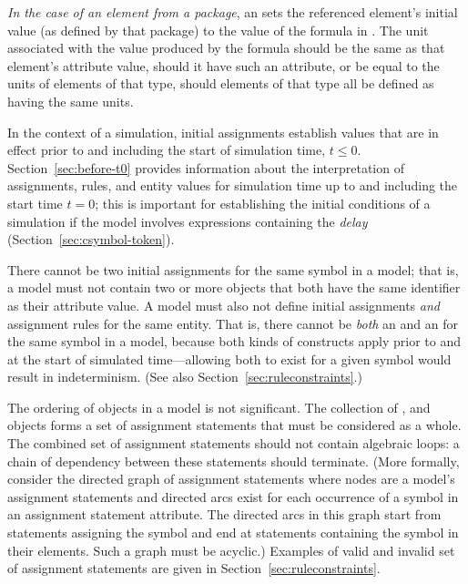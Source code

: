 \begin{itemize}
\begin{blockChanged}
\item \emph{In the case of an element from a package}, an \InitialAssignment sets
  the referenced element's initial value (as defined by that package) to the value of the formula in
  .  The unit associated with the value produced by
  the formula should be the same as that element's 
  attribute value, should it have such an attribute, or be equal to
  the units of elements of that type, should elements of that type
  all be defined as having the same units.

\end{blockChanged}

\end{itemize}

In the context of a simulation, initial assignments establish
values that are in effect prior to and including the start of
simulation time, \ie $t \leq 0$.  Section~\ref{sec:before-t0}
provides information about the interpretation of assignments,
rules, and entity values for simulation time up to and including
the start time $t = 0$; this is important for establishing the
initial conditions of a simulation if the model involves
expressions containing the \emph{delay} 
(Section~\ref{sec:csymbol-token}).

There cannot be two initial assignments for the same symbol in a
model; that is, a model must not contain two or more
\InitialAssignment objects that both have the same identifier as
their  attribute value.  A model must also not define
initial assignments \emph{and} assignment rules for the same
entity.  That is, there cannot be \emph{both} an
\InitialAssignment and an \AssignmentRule for the same symbol in a
model, because both kinds of constructs apply prior to and at the
start of simulated time---allowing both to exist for a given
symbol would result in indeterminism.  (See also
Section~\ref{sec:ruleconstraints}.)

The ordering of \InitialAssignment objects in a model is not
significant.  The collection of \InitialAssignment,
\AssignmentRule and \KineticLaw objects forms a set of assignment
statements that must be considered as a whole.  The combined set
of assignment statements should not contain algebraic loops: a
chain of dependency between these statements should terminate.
(More formally, consider the directed graph of assignment
statements where nodes are a model's assignment statements and
directed arcs exist for each occurrence of a symbol in an
assignment statement  attribute.  The directed arcs in
this graph start from statements assigning the symbol and end at
statements containing the symbol in their  elements.
Such a graph must be acyclic.) Examples of valid and invalid set
of assignment statements are given in
Section~\ref{sec:ruleconstraints}.

